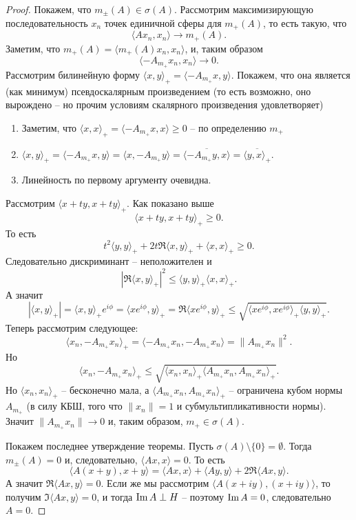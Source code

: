 \begin{proof}
    Покажем, что $m_{\pm}(A) \in \sigma(A)$.
    Рассмотрим максимизирующую последовательность $x_n$ точек единичной сферы для $m_+(A)$, то есть такую, что
    \[
        \langle Ax_n, x_n \rangle \rightarrow m_+(A).
    \]
    Заметим, что $m_+(A) = \langle m_+(A) x_n, x_n \rangle$, и, таким образом
    \[
        \langle -A_{m_+}x_n, x_n \rangle \rightarrow 0.
    \]
    Рассмотрим билинейную форму $\langle x, y \rangle_+ = \langle -A_{m_+}x, y \rangle$.
    Покажем, что она является (как минимум) псевдоскалярным произведением (то есть возможно, оно вырождено -- но прочим условиям скалярного произведения удовлетворяет)
    \begin{enumerate}
        \item Заметим, что $\langle x, x \rangle_+ = \langle -A_{m_+}x, x \rangle \geq 0$ -- по определению $m_+$
        \item $\langle x, y \rangle_+ = \langle -A_{m_+}x, y \rangle = \langle x, -A_{m_+} y \rangle = \overline{\langle -A_{m_+} y, x \rangle} = \overline{\langle y, x \rangle_+}$.
        \item Линейность по первому аргументу очевидна.
    \end{enumerate}
    Рассмотрим $\langle x + ty, x + ty \rangle_+$.
    Как показано выше
    \[
        \langle x + ty, x + ty \rangle_+ \geq 0.
    \]
    То есть
    \[
        t^2\langle y, y \rangle_+ + 2t \Re \langle x, y \rangle_+ + \langle x, x \rangle_+ \geq 0.
    \]
    Следовательно дискриминант -- неположителен и 
    \[
        |\Re \langle x, y \rangle_+|^2 \leq \langle y, y \rangle_+ \langle x, x \rangle_+.
    \]
    А значит
    \[
        |\langle x, y \rangle_+| = \langle x, y \rangle_+ e^{i\phi} = \langle x e^{i\phi}, y \rangle_+ = \Re \langle xe^{i\phi}, y \rangle_+ \leq \sqrt{\langle xe^{i\phi}, x e^{i\phi} \rangle_+ \langle y, y \rangle_+}.
    \]
    Теперь рассмотрим следующее:
    \[
        \langle x_n, -A_{m_+} x_n \rangle_+ = \langle -A_{m_+}x_n, -A_{m_+}x_n \rangle = \|A_{m_+}x_n\|^2.
    \]
    Но
    \[
        \langle x_n, -A_{m_+} x_n \rangle_+ \leq \sqrt{\langle x_n, x_n \rangle_+ \langle A_{m_+} x_n, A_{m_+} x_n \rangle_+}.
    \]
    Но $\langle x_n, x_n \rangle_+$ -- бесконечно мала, а $\langle A_{m_+} x_n, A_{m_+} x_n \rangle_+$ -- ограничена кубом нормы $A_{m_+}$ (в силу КБШ, того что $\|x_n\| = 1$ и субмультипликативности нормы).
    Значит $\|A_{m_+}x_n\| \rightarrow 0$ и, таким образом, $m_+ \in \sigma(A)$.

    Покажем последнее утверждение теоремы.
    Пусть $\sigma(A) \setminus \{0\} = \emptyset$.
    Тогда $m_\pm(A) = 0$ и, следовательно, $\langle Ax, x \rangle = 0$.
    То есть
    \[ 
    \langle A(x + y), x + y \rangle = \langle Ax, x \rangle + \langle Ay, y \rangle + 2\Re \langle Ax, y \rangle.
    \]
    А значит $\Re \langle Ax, y \rangle = 0$. Если же мы рассмотрим $\langle A(x + iy), (x + iy) \rangle$, то получим $\Im \langle Ax, y \rangle = 0$, и тогда $\operatorname{Im} A \perp H$ -- поэтому $\operatorname{Im} A = 0$, следовательно $A = 0$.
\end{proof}
